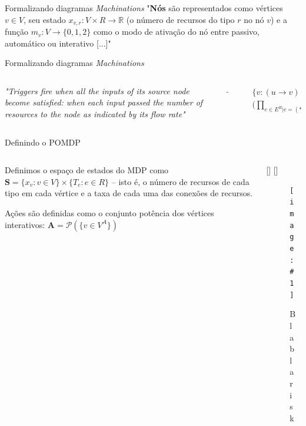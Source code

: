 \documentclass[aspectratio=169]{beamer}
\newcommand{\insertfigure}[3]{
  \StrBehind{#1}{/}[\FileWithExt]
  \StrBefore{\FileWithExt}{.}[\FileName]
  \begin{figure}[h!]
    \vspace{0.25cm}
    \centering
    \texttt{[image: \#1]}
    \caption{#2}
    \label{fig:\FileName}
  \end{figure}
}
\newcommand{\St}{\mathbf{S}}
\newcommand{\A}{\mathbf{A}}
\begin{document}
\begin{frame}{Formalizando diagramas \textit{Machinations}}
    "\textbf{Nós} são representados como vértices $v \in V$, seu estado $x_{v,r}: V \times R \rightarrow \mathbb{R}$ (o número de recursos do tipo $r$ no nó $v$) e a função $m_{v}: V \rightarrow \{0,1,2\}$ como o modo de ativação do nó entre passivo, automático ou interativo [...]"
\end{frame}

\begin{frame}{Formalizando diagramas \textit{Machinations}}

    \begin{columns}
        \begin{column}{0.4\textwidth}
            \vspace{0.75cm}

            \textit{"Triggers fire when all the inputs of its source node become satisfied: when each input passed the number of resources to the node as indicated by its flow rate"}
        \end{column}
        \begin{column}{0.1\textwidth}
            \begin{center}
                $\rightarrow$
            \end{center}
        \end{column}
        \begin{column}{0.4\textwidth}
            \vspace{0.75cm}
            \begin{align*}
                &\{v: (u \rightarrow v) \in E^G\ | \\\ &\Big(\prod_{e \in E^R | e = (* \rightarrow u)}{\Delta e(t-1) = T_e \Big)} = 1 \}\\
            \end{align*}
        \end{column}
    \end{columns}
\end{frame}

\begin{frame}{Definindo o POMDP}
    \begin{columns}
	\begin{column}{0.5\textwidth}
	    Definimos o espaço de estados do MDP como $\St = \{x_v: v \in V\} \times \{T_e: e \in R \}$ -- isto é, o número de recursos de cada tipo em cada vértice e a taxa de cada uma das conexões de recursos.

	    \vspace{0.25cm}

	    Ações são definidas como o conjunto potência dos vértices interativos: $\A = \mathcal{P}(\{ v \in V^A \})$
	\end{column}
	\begin{column}{0.5\textwidth}
	    \insertfigure
		{figures/risk.png}
		{Bla bla risk}
		{1.0}
	\end{column}
    \end{columns}
\end{frame}
\end{document}
